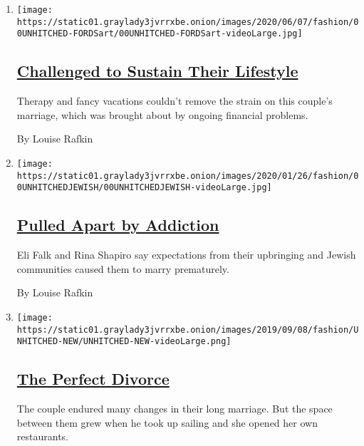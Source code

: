\begin{enumerate}
\def\labelenumi{\arabic{enumi}.}
\item
  \texttt{[image: https://static01.graylady3jvrrxbe.onion/images/2020/06/07/fashion/00UNHITCHED-FORDSart/00UNHITCHED-FORDSart-videoLarge.jpg]}

  \hypertarget{challenged-to-sustain-their-lifestyle}{%
  \subsection{\texorpdfstring{\href{/2020/06/03/fashion/weddings/Unhitched-couple-discusses-their-marriage-and-divorce.html}{Challenged
  to Sustain Their
  Lifestyle}}{Challenged to Sustain Their Lifestyle}}\label{challenged-to-sustain-their-lifestyle}}

  Therapy and fancy vacations couldn't remove the strain on this
  couple's marriage, which was brought about by ongoing financial
  problems.

  By Louise Rafkin
\item
  \texttt{[image: https://static01.graylady3jvrrxbe.onion/images/2020/01/26/fashion/00UNHITCHEDJEWISH/00UNHITCHEDJEWISH-videoLarge.jpg]}

  \hypertarget{pulled-apart-by-addiction}{%
  \subsection{\texorpdfstring{\href{/2020/01/27/fashion/weddings/Unhitched-couple-is-pulled-apart-by-addiction.html}{Pulled
  Apart by
  Addiction}}{Pulled Apart by Addiction}}\label{pulled-apart-by-addiction}}

  Eli Falk and Rina Shapiro say expectations from their upbringing and
  Jewish communities caused them to marry prematurely.

  By Louise Rafkin
\item
  \texttt{[image: https://static01.graylady3jvrrxbe.onion/images/2019/09/08/fashion/UNHITCHED-NEW/UNHITCHED-NEW-videoLarge.png]}

  \hypertarget{the-perfect-divorce}{%
  \subsection{\texorpdfstring{\href{/interactive/2019/09/07/multimedia/how-to-get-divorced.html}{The
  Perfect Divorce}}{The Perfect Divorce}}\label{the-perfect-divorce}}

  The couple endured many changes in their long marriage. But the space
  between them grew when he took up sailing and she opened her own
  restaurants.


\end{enumerate}
